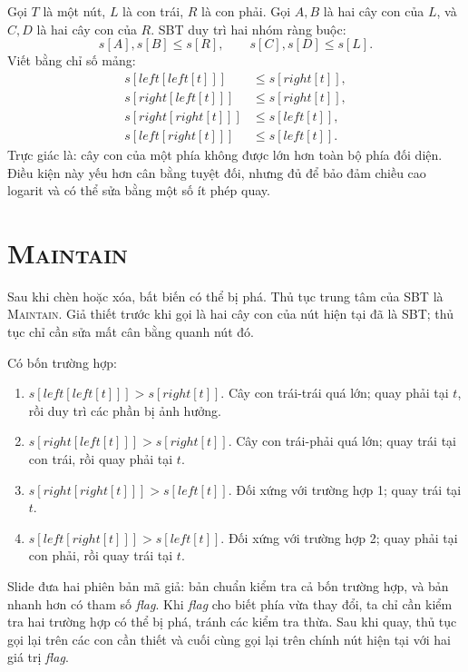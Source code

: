 \documentclass[11pt]{article}
\begin{document}
Gọi \(T\) là một nút, \(L\) là con trái, \(R\) là con phải. Gọi \(A,B\) là
hai cây con của \(L\), và \(C,D\) là hai cây con của \(R\). SBT duy trì hai
nhóm ràng buộc:
\[
  s[A],s[B]\le s[R],
  \qquad
  s[C],s[D]\le s[L].
\]
Viết bằng chỉ số mảng:
\[
\begin{aligned}
s[\mathit{left}[\mathit{left}[t]]]&\le s[\mathit{right}[t]],\\
s[\mathit{right}[\mathit{left}[t]]]&\le s[\mathit{right}[t]],\\
s[\mathit{right}[\mathit{right}[t]]]&\le s[\mathit{left}[t]],\\
s[\mathit{left}[\mathit{right}[t]]]&\le s[\mathit{left}[t]].
\end{aligned}
\]
Trực giác là: cây con của một phía không được lớn hơn toàn bộ phía đối diện.
Điều kiện này yếu hơn cân bằng tuyệt đối, nhưng đủ để bảo đảm chiều cao
logarit và có thể sửa bằng một số ít phép quay.

\section{\textsc{Maintain}}

Sau khi chèn hoặc xóa, bất biến có thể bị phá. Thủ tục trung tâm của SBT là
\textsc{Maintain}. Giả thiết trước khi gọi là hai cây con của nút hiện tại đã
là SBT; thủ tục chỉ cần sửa mất cân bằng quanh nút đó.

Có bốn trường hợp:
\begin{enumerate}
  \item \(s[\mathit{left}[\mathit{left}[t]]]>s[\mathit{right}[t]]\). Cây con
  trái-trái quá lớn; quay phải tại \(t\), rồi duy trì các phần bị ảnh hưởng.
  \item \(s[\mathit{right}[\mathit{left}[t]]]>s[\mathit{right}[t]]\). Cây con
  trái-phải quá lớn; quay trái tại con trái, rồi quay phải tại \(t\).
  \item \(s[\mathit{right}[\mathit{right}[t]]]>s[\mathit{left}[t]]\). Đối
  xứng với trường hợp 1; quay trái tại \(t\).
  \item \(s[\mathit{left}[\mathit{right}[t]]]>s[\mathit{left}[t]]\). Đối
  xứng với trường hợp 2; quay phải tại con phải, rồi quay trái tại \(t\).
\end{enumerate}

Slide đưa hai phiên bản mã giả: bản chuẩn kiểm tra cả bốn trường hợp, và bản
nhanh hơn có tham số \textit{flag}. Khi \textit{flag} cho biết phía vừa thay
đổi, ta chỉ cần kiểm tra hai trường hợp có thể bị phá, tránh các kiểm tra
thừa. Sau khi quay, thủ tục gọi lại trên các con cần thiết và cuối cùng gọi
lại trên chính nút hiện tại với hai giá trị \textit{flag}.
\end{document}

